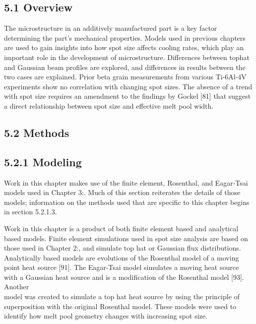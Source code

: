 \documentclass[10pt]{article}
\begin{document}
\subsection*{5.1 Overview}
The microstructure in an additively manufactured part is a key factor determining the part's mechanical properties. Models used in previous chapters are used to gain insights into how spot size affects cooling rates, which play an important role in the development of microstructure. Differences between tophat and Gaussian beam profiles are explored, and differences in results between the two cases are explained. Prior beta grain measurements from various Ti-6Al-4V experiments show no correlation with changing spot sizes. The absence of a trend with spot size requires an amendment to the findings by Gockel [81] that suggest a direct relationship between spot size and effective melt pool width.

\subsection*{5.2 Methods}
\subsection*{5.2.1 Modeling}
Work in this chapter makes use of the finite element, Rosenthal, and Eagar-Tsai models used in Chapter 3:. Much of this section reiterates the details of those models; information on the methods used that are specific to this chapter begins in section 5.2.1.3.

Work in this chapter is a product of both finite element based and analytical based models. Finite element simulations used in spot size analysis are based on those used in Chapter 2:, and simulate top hat or Gaussian flux distributions. Analytically based models are evolutions of the Rosenthal model of a moving point heat source [91]. The Eagar-Tsai model simulates a moving heat source with a Gaussian heat source and is a modification of the Rosenthal model [93]. Another\\
model was created to simulate a top hat heat source by using the principle of superposition with the original Rosenthal model. These models were used to identify how melt pool geometry changes with increasing spot size.
\end{document}
